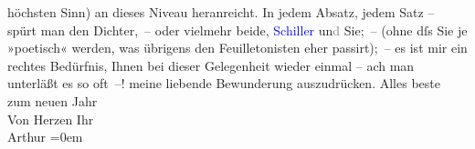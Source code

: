                    höchsten Sinn) an dieses Niveau heranreicht. In jedem Absatz, jedem Satz – spürt
                    man den Dichter, – oder vielmehr beide, \textcolor{blue}{Schiller}{}\ledrightnote{\textcolor{blue}{Friedrich von Schiller}} un\textcolor{gray}{d} Sie; – (ohne dſs Sie je
                    »poetisch« werden, was übrigens den Feuilletonisten eher passirt); – es {\pb}ist mir ein rechtes Bedürfnis, Ihnen bei dieser
                    Gelegenheit wieder einmal – ach man unterläßt es so oft –! meine liebende
                    Bewunderung auszudrücken.\pend
           \pstart
           Alles beste zum neuen Jahr{\\[\baselineskip]}Von Herzen Ihr{\\[\baselineskip]}\spacefill\mbox{Arthur}\pend
           \leftskip=0em{}\endnumbering{}  
      